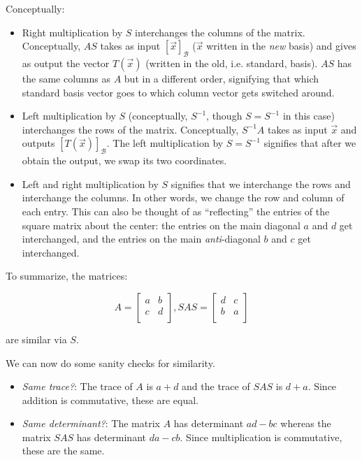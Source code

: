 \documentclass[10pt]{amsart}
\begin{document}
Conceptually:

\begin{itemize}
\item Right multiplication by $S$ interchanges the columns of the
  matrix. Conceptually, $AS$ takes as input $[\vec{x}]_{\mathcal{B}}$
  ($\vec{x}$ written in the {\em new} basis) and gives as output the
  vector $T(\vec{x})$ (written in the old, i.e. standard, basis). $AS$
  has the same columns as $A$ but in a different order, signifying
  that which standard basis vector goes to which column vector gets
  switched around.
\item Left multiplication by $S$ (conceptually, $S^{-1}$, though $S =
  S^{-1}$ in this case) interchanges the rows of the
  matrix. Conceptually, $S^{-1}A$ takes as input $\vec{x}$ and outputs
  $[T(\vec{x})]_{\mathcal{B}}$. The left multiplication by $S = S^{-1}$
  signifies that after we obtain the output, we swap its two
  coordinates.
\item Left and right multiplication by $S$ signifies that we
  interchange the rows and interchange the columns. In other words, we
  change the row and column of each entry. This can also be thought of
  as ``reflecting'' the entries of the square matrix about the center:
  the entries on the main diagonal $a$ and $d$ get interchanged, and
  the entries on the main {\em anti}-diagonal $b$ and $c$ get
  interchanged.
\end{itemize}

To summarize, the matrices:

$$A = \left[\begin{matrix} a & b \\ c & d \\\end{matrix}\right], SAS = \left[\begin{matrix} d & c \\ b & a \\\end{matrix}\right]$$

are similar via $S$.

We can now do some sanity checks for similarity.

\begin{itemize}
\item {\em Same trace?}: The trace of $A$ is $a + d$ and the trace of
  $SAS$ is $d + a$. Since addition is commutative, these are equal.
\item {\em Same determinant?}: The matrix $A$ has determinant $ad -
  bc$ whereas the matrix $SAS$ has determinant $da - cb$. Since
  multiplication is commutative, these are the same.
\end{itemize}
\end{document}
